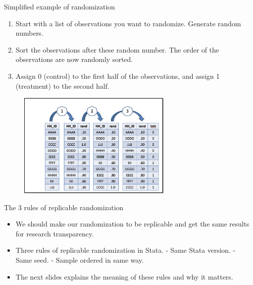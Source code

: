 \documentclass[aspectratio=169]{beamer}
\begin{document}
\begin{frame}[fragile]{Simplified example of randomization}
\begin{multicols}{2}	
	
	\begin{enumerate}	
		\item<1>  Start with a list of observations you want to randomize. Generate random numbers.
		\item<1> Sort the observations after these random number. The order of the observations are now randomly sorted.
		\item<1> Assign 0 (control) to the first half of the observations, and assign 1 (treatment) to the second half.
	\end{enumerate}
	
	\begin{figure}
		\centering
		\includegraphics[width=75mm]{img/Randomization3}
	\end{figure}
	
\end{multicols}
\end{frame}


\begin{frame}{The 3 rules of replicable randomization}

\begin{itemize}[<default overlay specification>]
	\item<1> We should make our randomization to be replicable and get the same results for research transparency.
	\item<1> Three rules of replicable randomization in Stata.
		\newline - Same Stata version.
		\newline - Same seed. 
		\newline - Sample ordered in same way.
	\item<1> The next slides explains the meaning of these rules and why it matters.
\end{itemize}

\end{frame}
\end{document}
